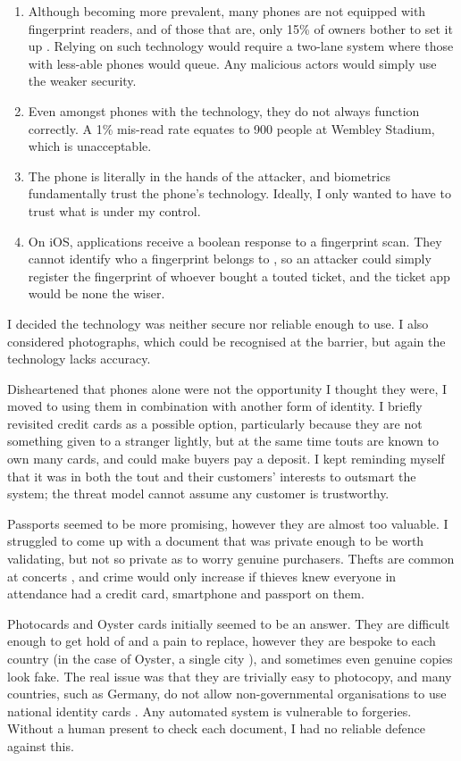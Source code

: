 \documentclass[12pt,a4paper]{bhamdissertation}
\begin{document}
\begin{enumerate}
    \item Although becoming more prevalent, many phones are not equipped with fingerprint readers, and of those that are, only 15\% of owners bother to set it up \cite{B16}. Relying on such technology would require a two-lane system where those with less-able phones would queue. Any malicious actors would simply use the weaker security.
    \item Even amongst phones with the technology, they do not always function correctly. A 1\% mis-read rate equates to 900 people at Wembley Stadium, which is unacceptable.
    \item The phone is literally in the hands of the attacker, and biometrics fundamentally trust the phone's technology. Ideally, I only wanted to have to trust what is under my control.
    \item On iOS, applications receive a boolean response to a fingerprint scan. They cannot identify who a fingerprint belongs to \cite{G16}, so an attacker could simply register the fingerprint of whoever bought a touted ticket, and the ticket app would be none the wiser.
\end{enumerate}

I decided the technology was neither secure nor reliable enough to use. I also considered photographs, which could be recognised at the barrier, but again the technology lacks accuracy.

Disheartened that phones alone were not the opportunity I thought they were, I moved to using them in combination with another form of identity. I briefly revisited credit cards as a possible option, particularly because they are not something given to a stranger lightly, but at the same time touts are known to own many cards, and could make buyers pay a deposit. I kept reminding myself that it was in both the tout and their customers' interests to outsmart the system; the threat model cannot assume any customer is trustworthy.

Passports seemed to be more promising, however they are almost too valuable. I struggled to come up with a document that was private enough to be worth validating, but not so private as to worry genuine purchasers. Thefts are common at concerts \cite{C10}, and crime would only increase if thieves knew everyone in attendance had a credit card, smartphone and passport on them.

Photocards and Oyster cards initially seemed to be an answer. They are difficult enough to get hold of and a pain to replace, however they are bespoke to each country (in the case of Oyster, a single city \cite{O17}), and sometimes even genuine copies look fake. The real issue was that they are trivially easy to photocopy, and many countries, such as Germany, do not allow non-governmental organisations to use national identity cards \cite{M11}. Any automated system is vulnerable to forgeries. Without a human present to check each document, I had no reliable defence against this.
\end{document}
